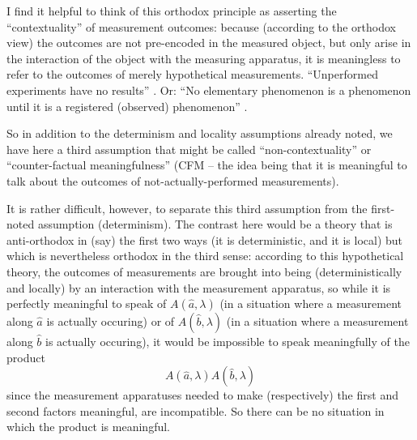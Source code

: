 \documentclass[aps,prc,onecolumn,12pt]{revtex4-2}
\begin{document}
I find it helpful to think of this orthodox principle as asserting the
``contextuality'' of measurement outcomes:  because (according to the
orthodox view) the outcomes are not pre-encoded in the measured object, but
only arise in the interaction of the  object with the measuring
apparatus, it is meaningless to refer to the outcomes of merely
hypothetical measurements.  ``Unperformed experiments have no
results'' \cite{peres}.  Or:  ``No elementary phenomenon is a
phenomenon until it is a registered (observed) phenomenon'' \cite{wheeler}.

So in addition to the determinism and locality assumptions already
noted, we have here a third assumption that might be called
``non-contextuality'' or ``counter-factual meaningfulness'' (CFM --
the idea being that it is meaningful to talk about the outcomes of
not-actually-performed measurements).

It is rather difficult, however, to separate this third assumption
from the first-noted assumption (determinism).  The contrast here
would be a theory that is anti-orthodox in (say) the first two ways
(it is deterministic, and it is local) but which is nevertheless
orthodox in the third sense:  according to this
hypothetical theory, the outcomes
of measurements are brought into being (deterministically and locally)
by an interaction with the measurement apparatus, so while it is
perfectly meaningful to speak of $A(\hat{a},\lambda)$ (in a situation
where a measurement along $\hat{a}$ is actually occuring) or of
$A(\hat{b},\lambda)$ (in a situation where a measurement along
  $\hat{b}$ is actually occuring), it would be impossible to speak
  meaningfully of the product
\begin{equation}
A(\hat{a},\lambda) A(\hat{b},\lambda)
\end{equation}
since the measurement apparatuses needed to make (respectively) the
first and second factors meaningful, are incompatible.  So there can
be no situation in which the product is meaningful.
\end{document}
